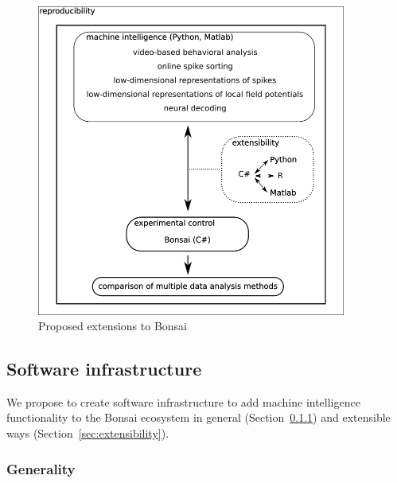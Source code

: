 \begin{figure}
  \includegraphics[width=4in]{figures/proposed_bonsai_extensions.png}
  \caption{Proposed extensions to Bonsai}
  \label{fig:proposedBonsaiExtensions}
\end{figure}


\subsection{Software infrastructure}
\label{sec:infrastructure}

We propose to create software infrastructure to add machine intelligence
functionality to the Bonsai ecosystem in general
(Section~\ref{sec:generality}) and extensible ways
(Section~\ref{sec:extensibility}).

\subsubsection{Generality}
\label{sec:generality}


